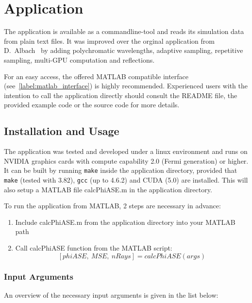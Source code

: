 \section{Application}
\label{sec:application}
The application is available as a commandline-tool and reads its
simulation data from plain text files. It was improved over the  orginal application
from D.~Albach~\cite{ASE2010} by adding
polychromatic wavelengths, adaptive sampling, repetitive sampling,
multi-GPU computation and reflections.


For an easy access, the offered MATLAB compatible interface
(see~\ref{label:matlab_interface}) is highly recommended. Experienced
users with the intention to call the application directly should
consult the README file, the provided example code or the source code
for more details.

\subsection{Installation and Usage}
The application was tested and developed under a linux environment and
runs on NVIDIA graphics cards with compute capability 2.0 (Fermi
generation) or higher.  It can be built by running \texttt{make} inside the
application directory, provided that \texttt{make} (tested with 3.82), \texttt{gcc} (up
to 4.6.2) and CUDA (5.0) are installed.  This will also setup a MATLAB
file calcPhiASE.m in the application directory.

To run the application from MATLAB, 2 steps are necessary in
advance:
\begin{enumerate}
\label{label:matlab_interface}
  \item Include calcPhiASE.m from the application directory into your
    MATLAB path
  \item Call calcPhiASE function from the MATLAB
    script: \[[phiASE,~MSE,~nRays] = calcPhiASE(args)\]
\end{enumerate}

\subsubsection{Input Arguments}
An overview of the necessary input arguments is given in the list
below:

